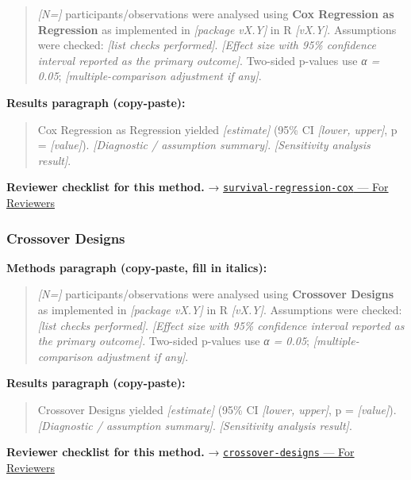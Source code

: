 \documentclass[
]{article}
\begin{document}
\begin{quote}
\emph{{[}N={]}} participants/observations were analysed using
\textbf{Cox Regression as Regression} as implemented in \emph{{[}package
vX.Y{]}} in R \emph{{[}vX.Y{]}}. Assumptions were checked: \emph{{[}list
checks performed{]}}. \emph{{[}Effect size with 95\% confidence interval
reported as the primary outcome{]}}. Two-sided p-values use \emph{α =
0.05}; \emph{{[}multiple-comparison adjustment if any{]}}.
\end{quote}

\textbf{Results paragraph (copy-paste):}

\begin{quote}
Cox Regression as Regression yielded \emph{{[}estimate{]}} (95\% CI
\emph{{[}lower, upper{]}}, p = \emph{{[}value{]}}). \emph{{[}Diagnostic
/ assumption summary{]}}. \emph{{[}Sensitivity analysis result{]}}.
\end{quote}

\textbf{Reviewer checklist for this method.} →
\href{../chapters/07-regression/survival-regression-cox.Rmd\#for-reviewers}{\texttt{survival-regression-cox}
--- For Reviewers}

\subsubsection{Crossover Designs}\label{crossover-designs}

\textbf{Methods paragraph (copy-paste, fill in italics):}

\begin{quote}
\emph{{[}N={]}} participants/observations were analysed using
\textbf{Crossover Designs} as implemented in \emph{{[}package vX.Y{]}}
in R \emph{{[}vX.Y{]}}. Assumptions were checked: \emph{{[}list checks
performed{]}}. \emph{{[}Effect size with 95\% confidence interval
reported as the primary outcome{]}}. Two-sided p-values use \emph{α =
0.05}; \emph{{[}multiple-comparison adjustment if any{]}}.
\end{quote}

\textbf{Results paragraph (copy-paste):}

\begin{quote}
Crossover Designs yielded \emph{{[}estimate{]}} (95\% CI \emph{{[}lower,
upper{]}}, p = \emph{{[}value{]}}). \emph{{[}Diagnostic / assumption
summary{]}}. \emph{{[}Sensitivity analysis result{]}}.
\end{quote}

\textbf{Reviewer checklist for this method.} →
\href{../chapters/16-design/crossover-designs.Rmd\#for-reviewers}{\texttt{crossover-designs}
--- For Reviewers}
\end{document}
